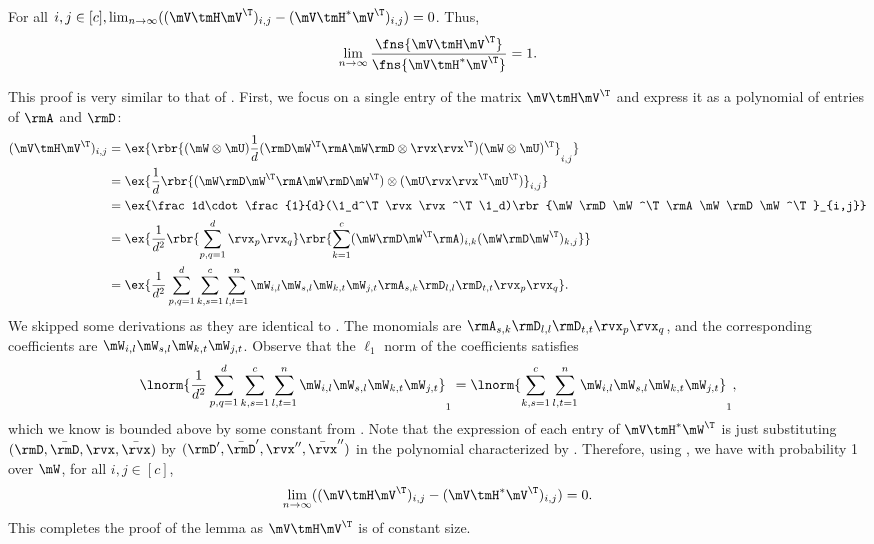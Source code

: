 \begin{proofof}{}
\begin{lemma}
\label{lemma:VHV-equivalence}
For all $i,j\in[c], \lim_{n\to\infty}((\mV\tmH\mV^\T)_{i,j}-(\mV\tmH^*\mV^\T)_{i,j})=0$. Thus,
\begin{equation}
\lim_{n\to\infty}\frac{\fns{\mV\tmH\mV^\T}}{\fns{\mV\tmH^*\mV^\T}}=1.
\end{equation}
\end{lemma}
\begin{proofof}{}
This proof is very similar to that of . First, we focus on a single entry of the matrix $\mV\tmH\mV^\T$ and express it as a polynomial of entries of $\rmA$ and $\rmD$:
\begin{equation}
\label{eqn:proof-VHV-equiv-poly}
\begin{split}
(\mV\tmH\mV^\T)_{i,j} &= \ex{\rbr{(\mW\otimes \mU)\frac1d(\rmD\mW^\T\rmA\mW\rmD\otimes \rvx\rvx^\T)(\mW\otimes \mU)^\T}_{i,j}}\\
&= \ex{\frac1d\rbr{(\mW\rmD\mW^\T\rmA\mW\rmD\mW^\T)\otimes(\mU\rvx\rvx^\T \mU^\T)}_{i,j}}\\
&= \ex{\frac1d\cdot \frac{1}{d}(\1_d^\T\rvx\rvx^\T \1_d)\rbr{\mW\rmD\mW^\T\rmA\mW\rmD\mW^\T}_{i,j}}\\
&= \ex{\frac{1}{d^2}\rbr{\sum_{p,q=1}^d\rvx_p\rvx_q}\rbr{\sum_{k=1}^c(\mW\rmD\mW^\T\rmA)_{i,k}(\mW\rmD\mW^\T)_{k,j}}}\\
&= \ex{\frac{1}{d^2}\sum_{p,q=1}^d\sum_{k,s=1}^c\sum_{l,t=1}^n\mW_{i,l}\mW_{s,l}\mW_{k,t}\mW_{j,t}\rmA_{s,k}\rmD_{l,l}\rmD_{t,t}\rvx_p\rvx_q}.
\end{split}
\end{equation}
We skipped some derivations as they are identical to .
The monomials are $\rmA_{s,k}\rmD_{l,l}\rmD_{t,t}\rvx_p\rvx_q$, and the corresponding coefficients are $\mW_{i,l}\mW_{s,l}\mW_{k,t}\mW_{j,t}$. Observe that the $\ell_1$ norm of the coefficients satisfies
\begin{equation}
    \lnorm{\frac{1}{d^2}\sum_{p,q=1}^d\sum_{k,s=1}^c\sum_{l,t=1}^n\mW_{i,l}\mW_{s,l}\mW_{k,t}\mW_{j,t}}_1 = \lnorm{\sum_{k,s=1}^c\sum_{l,t=1}^n\mW_{i,l}\mW_{s,l}\mW_{k,t}\mW_{j,t}}_1,
\end{equation}
which we know is bounded above by some constant from .
Note that the expression of each entry of $\mV\tmH^*\mW^\T$ is just substituting $(\rmD,\bar\rmD,\rvx,\bar\rvx)$ by $(\rmD',\bar\rmD',\rvx'',\bar\rvx'')$ in the polynomial characterized by .
Therefore, using , we have with probability 1 over $\mW$, for all $i,j\in[c]$, 
\begin{equation}
    \lim_{n\to\infty}((\mV\tmH\mV^\T)_{i,j}-(\mV\tmH^*\mV^\T)_{i,j})=0.
\end{equation}
This completes the proof of the lemma as $\mV\tmH\mV^\T$ is of constant size.
\end{proofof}


\end{proofof}
